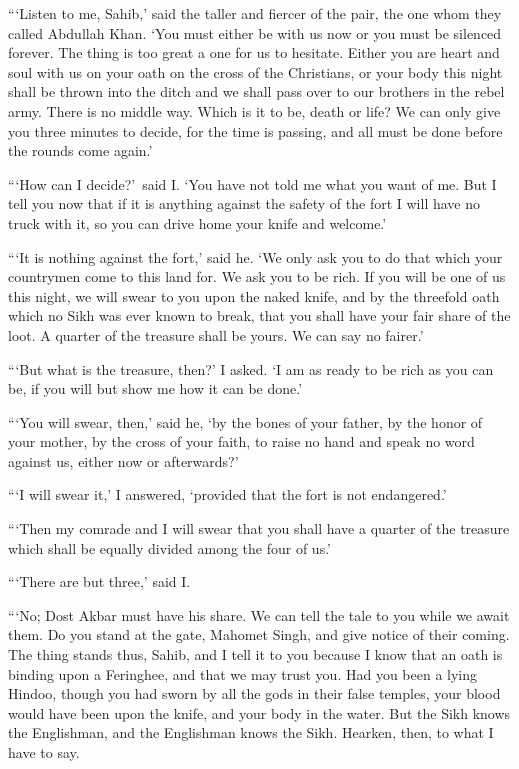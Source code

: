 \documentclass[12pt,english,oneside]{book}
\begin{document}
{}```Listen to me, Sahib,' said the taller and fiercer of the pair,
the one whom they called Abdullah Khan. `You must either be with us
now or you must be silenced forever. The thing is too great a one
for us to hesitate. Either you are heart and soul with us on your
oath on the cross of the Christians, or your body this night shall
be thrown into the ditch and we shall pass over to our brothers in
the rebel army. There is no middle way. Which is it to be, death or
life? We can only give you three minutes to decide, for the time is
passing, and all must be done before the rounds come again.'

{}```How can I decide?'\ said I. `You have not told me what you
want of me. But I tell you now that if it is anything against the
safety of the fort I will have no truck with it, so you can drive
home your knife and welcome.'

{}```It is nothing against the fort,' said he. `We only ask you to
do that which your countrymen come to this land for. We ask you to
be rich. If you will be one of us this night, we will swear to you
upon the naked knife, and by the threefold oath which no Sikh was
ever known to break, that you shall have your fair share of the loot.
A quarter of the treasure shall be yours. We can say no fairer.'

{}```But what is the treasure, then?' I asked. `I am as ready to
be rich as you can be, if you will but show me how it can be done.'

{}```You will swear, then,' said he, `by the bones of your father,
by the honor of your mother, by the cross of your faith, to raise
no hand and speak no word against us, either now or afterwards?'

{}```I will swear it,' I answered, `provided that the fort is not
endangered.'

{}```Then my comrade and I will swear that you shall have a quarter
of the treasure which shall be equally divided among the four of us.'

{}```There are but three,' said I.

{}```No; Dost Akbar must have his share. We can tell the tale to
you while we await them. Do you stand at the gate, Mahomet Singh,
and give notice of their coming. The thing stands thus, Sahib, and
I tell it to you because I know that an oath is binding upon a Feringhee,
and that we may trust you. Had you been a lying Hindoo, though you
had sworn by all the gods in their false temples, your blood would
have been upon the knife, and your body in the water. But the Sikh
knows the Englishman, and the Englishman knows the Sikh. Hearken,
then, to what I have to say.
\end{document}
